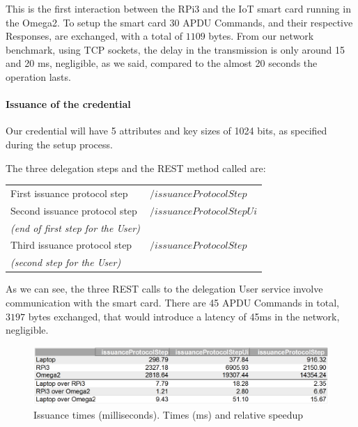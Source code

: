 \documentclass[journal]{IEEEtran}
\begin{document}
This is the first interaction between the RPi3 and the IoT smart card running in the Omega2. To setup the smart card 30 APDU Commands, and their respective Responses, are exchanged, with a total of $1109$ bytes. From our network benchmark, using TCP sockets, the delay in the transmission is only around 15 and 20 ms, negligible, as we said, compared to the almost 20 seconds the operation lasts.


\paragraph{Issuance of the credential}\hfil

Our credential will have 5 attributes and key sizes of 1024 bits, as specified during the setup process.

The three delegation steps and the REST method called are:

\begin{center}
	\begin{tabular}{l|l}
		First issuance protocol step & $/issuanceProtocolStep$ \\
		Second issuance protocol step  & $/issuanceProtocolStepUi$ \\
		\textit{(end of first step for the User)} & \\
		Third issuance protocol step & $/issuanceProtocolStep$ \\
		\textit{(second step for the User)}  & \\
	\end{tabular}
\end{center}





As we can see, the three REST calls to the delegation User service involve communication with the smart card. There are 45 APDU Commands in total, $3197$ bytes exchanged, that would introduce a latency of 45ms in the network, negligible.


\begin{figure}[bth]
	\includegraphics[width=\linewidth]{gfx/graphics/issuancetable}
	\caption{Issuance times (milliseconds). Times (ms) and relative speedup}
	\label{fig:issuance:graph}
\end{figure}
\end{document}
